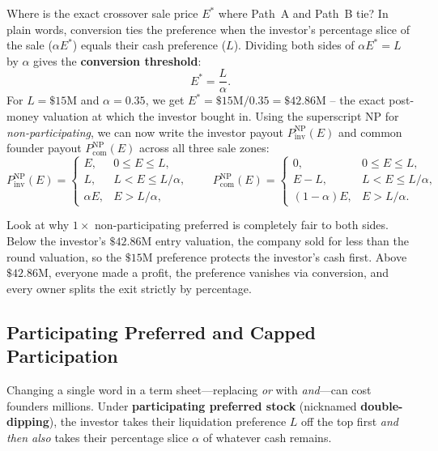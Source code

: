 Where is the exact crossover sale price $E^*$ where Path~A and Path~B tie? In plain words, conversion ties the preference when the investor's percentage slice of the sale ($\alpha E^*$) equals their cash preference ($L$). Dividing both sides of $\alpha E^* = L$ by $\alpha$ gives the \textbf{conversion threshold}:
\begin{equation}\label{eq:conversion-threshold}
  E^* = \frac{L}{\alpha}.
\end{equation}
For $L = \$15\text{M}$ and $\alpha = 0.35$, we get $E^* = \$15\text{M} / 0.35 = \$42.86\text{M}$ -- the exact post-money valuation at which the investor bought in. Using the superscript $\text{NP}$ for \emph{non-participating}, we can now write the investor payout $P_{\text{inv}}^{\text{NP}}(E)$ and common founder payout $P_{\text{com}}^{\text{NP}}(E)$ across all three sale zones:
\begin{equation}\label{eq:non-participating-waterfall}
  P_{\text{inv}}^{\text{NP}}(E) =
  \begin{cases}
    E, & 0 \le E \le L, \\
    L, & L < E \le L/\alpha, \\
    \alpha E, & E > L/\alpha,
  \end{cases}
  \qquad
  P_{\text{com}}^{\text{NP}}(E) =
  \begin{cases}
    0, & 0 \le E \le L, \\
    E - L, & L < E \le L/\alpha, \\
    (1 - \alpha)E, & E > L/\alpha.
  \end{cases}
\end{equation}

\begin{intuitionbox}
Look at why $1\times$ non-participating preferred is completely fair to both sides. Below the investor's $\$42.86\text{M}$ entry valuation, the company sold for less than the round valuation, so the $\$15\text{M}$ preference protects the investor's cash first. Above $\$42.86\text{M}$, everyone made a profit, the preference vanishes via conversion, and every owner splits the exit strictly by percentage.
\end{intuitionbox}

\subsection{Participating Preferred and Capped Participation}
\label{subsec:participating-preferred}

Changing a single word in a term sheet---replacing \emph{or} with \emph{and}---can cost founders millions. Under \textbf{participating preferred stock} (nicknamed \textbf{double-dipping}), the investor takes their liquidation preference $L$ off the top first \emph{and then also} takes their percentage slice $\alpha$ of whatever cash remains.

